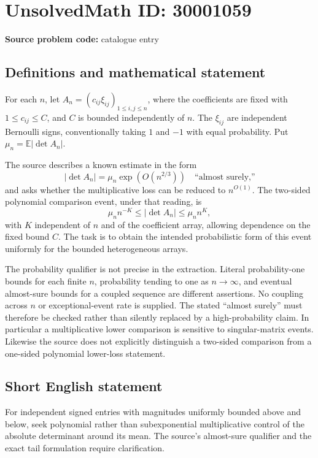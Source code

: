 \documentclass[11pt]{article}
\newcommand{\E}{\mathbb{E}}
\begin{document}
\section*{UnsolvedMath ID: 30001059}
\textbf{Source problem code:} catalogue entry
\subsection{Definitions and mathematical statement}
For each \(n\), let \(A_n=(c_{ij}\xi_{ij})_{1\leq i,j\leq n}\), where the coefficients are fixed with \(1\leq c_{ij}\leq C\), and \(C\) is bounded independently of \(n\). The \(\xi_{ij}\) are independent Bernoulli signs, conventionally taking \(1\) and \(-1\) with equal probability. Put \(\mu_n=\E|\det A_n|\).

The source describes a known estimate in the form
\[
|\det A_n|=\mu_n\exp(O(n^{2/3}))\quad\text{``almost surely,''}
\]
and asks whether the multiplicative loss can be reduced to \(n^{O(1)}\). The two-sided polynomial comparison event, under that reading, is
\[
\mu_n n^{-K}\leq |\det A_n|\leq\mu_n n^K,
\]
with \(K\) independent of \(n\) and of the coefficient array, allowing dependence on the fixed bound \(C\). The task is to obtain the intended probabilistic form of this event uniformly for the bounded heterogeneous arrays.

The probability qualifier is not precise in the extraction. Literal probability-one bounds for each finite \(n\), probability tending to one as \(n\to\infty\), and eventual almost-sure bounds for a coupled sequence are different assertions. No coupling across \(n\) or exceptional-event rate is supplied. The stated ``almost surely'' must therefore be checked rather than silently replaced by a high-probability claim. In particular a multiplicative lower comparison is sensitive to singular-matrix events. Likewise the source does not explicitly distinguish a two-sided comparison from a one-sided polynomial lower-loss statement.
\subsection{Short English statement}
For independent signed entries with magnitudes uniformly bounded above and below, seek polynomial rather than subexponential multiplicative control of the absolute determinant around its mean. The source's almost-sure qualifier and the exact tail formulation require clarification.
\end{document}
